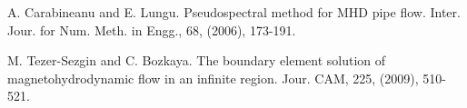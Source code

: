 
\begin{thebibliography}{10}

{\sc A. Carabineanu and E. Lungu}. {Pseudospectral method for MHD pipe flow}. Inter. Jour. for Num. Meth. in Engg., 68, (2006), 173-191.



{\sc M. Tezer-Sezgin and C. Bozkaya}. {The boundary element solution of magnetohydrodynamic flow in an infinite region}. Jour. CAM, 225, (2009), 510-521.

\end{thebibliography}

